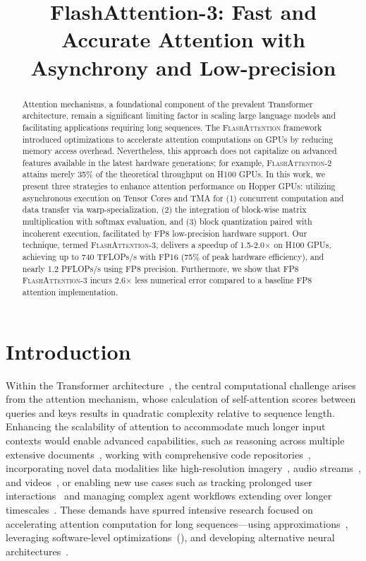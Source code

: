 \title{FlashAttention-3: Fast and Accurate Attention with Asynchrony and Low-precision}

\begin{abstract}
Attention mechanisms, a foundational component of the prevalent Transformer architecture, remain a significant limiting factor in scaling large language models and facilitating applications requiring long sequences. The \textsc{FlashAttention} framework introduced optimizations to accelerate attention computations on GPUs by reducing memory access overhead. Nevertheless, this approach does not capitalize on advanced features available in the latest hardware generations; for example, \textsc{FlashAttention-2} attains merely 35\% of the theoretical throughput on H100 GPUs. In this work, we present three strategies to enhance attention performance on Hopper GPUs: utilizing asynchronous execution on Tensor Cores and TMA for (1) concurrent computation and data transfer via warp-specialization, (2) the integration of block-wise matrix multiplication with softmax evaluation, and (3) block quantization paired with incoherent execution, facilitated by FP8 low-precision hardware support. Our technique, termed \textsc{FlashAttention-3}, delivers a speedup of 1.5-2.0$\times$ on H100 GPUs, achieving up to 740 TFLOPs/s with FP16 (75\% of peak hardware efficiency), and nearly 1.2 PFLOPs/s using FP8 precision. Furthermore, we show that FP8 \textsc{FlashAttention-3} incurs 2.6$\times$ less numerical error compared to a baseline FP8 attention implementation.
\end{abstract}

\section{Introduction}
\label{sec:intro}

Within the Transformer architecture~\citep{vaswani2017attention}, the central computational challenge arises from the attention mechanism, whose calculation of self-attention scores between queries and keys results in quadratic complexity relative to sequence length. Enhancing the scalability of attention to accommodate much longer input contexts would enable advanced capabilities, such as reasoning across multiple extensive documents~\citep{guo2021longt5,shaham2022scrolls,peng2023yarn}, working with comprehensive code repositories~\citep{roziere2023code, li2023starcoder}, incorporating novel data modalities like high-resolution imagery~\citep{chen2022scaling}, audio streams~\citep{gulati2020conformer}, and videos~\citep{ho2022video}, or enabling new use cases such as tracking prolonged user interactions~\citep{sun2019bert4rec} and managing complex agent workflows extending over longer timescales~\citep{yao2022react}. These demands have spurred intensive research focused on accelerating attention computation for long sequences—using approximations~\citep{katharopoulos2020transformers,choromanski2020rethinking, tay2020efficient}, leveraging software-level optimizations~(\citep{rabe2021self,dao2022flashattention,kwon2023efficient}), and developing alternative neural architectures~\citep{peng2023rwkv,sun2023retentive,gu2023mamba}.

